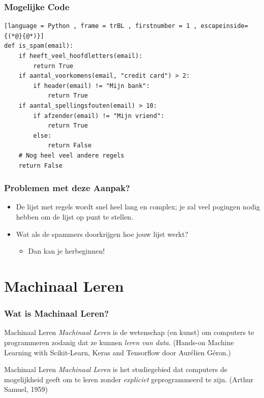 \documentclass[aspectratio=169]{beamer}
\begin{document}
\begin{frame}[fragile=singleslide]
\frametitle{Mogelijke Code}
\begin{lstlisting}[language = Python , frame = trBL , firstnumber = 1 , escapeinside={(*@}{@*)}]
def is_spam(email):
	if heeft_veel_hoofdletters(email):
		return True
	if aantal_voorkomens(email, "credit card") > 2:
		if header(email) != "Mijn bank":
			return True
	if aantal_spellingsfouten(email) > 10:
		if afzender(email) != "Mijn vriend":
			return True
		else:
			return False
	# Nog heel veel andere regels
	return False
\end{lstlisting}
\end{frame}

\begin{frame}
\frametitle{Problemen met deze Aanpak?}
\pause
\begin{itemize}
\item De lijst met regels wordt snel heel lang en complex; je zal veel pogingen nodig hebben om de lijst op punt te stellen.
\item Wat als de spammers doorkrijgen hoe jouw lijst werkt?
\begin{itemize}
	\item Dan kan je herbeginnen!
\end{itemize}
\end{itemize}
\end{frame}

\section{Machinaal Leren}

\begin{frame}
\frametitle{Wat is Machinaal Leren?}
\begin{block}{Machinaal Leren}
\emph{Machinaal Leren} is de wetenschap (en kunst) om computers te programmeren zodanig dat ze kunnen \emph{leren van data}.
(Hands-on Machine Learning with Scikit-Learn, Keras and Tensorflow door Aur\'elien G\'eron.)
\end{block}

\begin{block}{Machinaal Leren}
	\emph{Machinaal Leren} is het studiegebied dat computers de mogelijkheid geeft om te leren zonder \emph{expliciet} geprogrammeerd te zijn.
	 (Arthur Samuel, 1959)
\end{block}
\end{frame}
\end{document}
